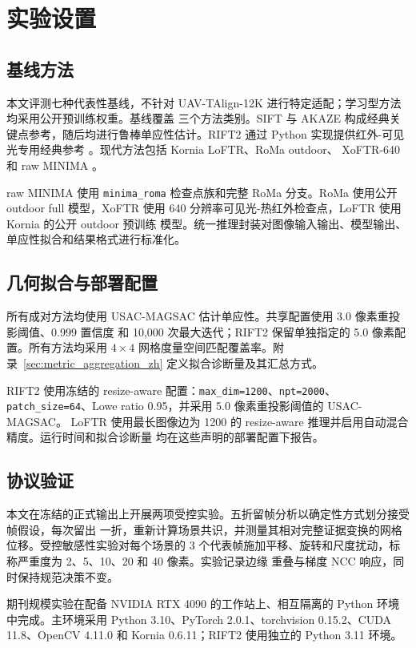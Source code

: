 
\section{实验设置}

\subsection{基线方法}

本文评测七种代表性基线，不针对 UAV-TAlign-12K 进行特定适配；学习型方法均采用公开预训练权重。基线覆盖
三个方法类别。SIFT 与 AKAZE 构成经典关键点参考，随后均进行鲁棒单应性估计。RIFT2 通过
Python 实现提供红外-可见光专用经典参考 \cite{li2023rift2,yagmur_rift2_python}。现代方法包括 Kornia LoFTR、RoMa outdoor、
XoFTR-640 和 raw MINIMA
\cite{sun2021loftr,edstedt2024roma,tuzcuoglu2024xoftr,ren2025minima}。

raw MINIMA 使用 \texttt{minima\_roma} 检查点族和完整 RoMa 分支。RoMa 使用公开 outdoor full
模型，XoFTR 使用 640 分辨率可见光-热红外检查点，LoFTR 使用 Kornia 的公开 outdoor 预训练
模型。统一推理封装对图像输入输出、模型输出、单应性拟合和结果格式进行标准化。

\subsection{几何拟合与部署配置}

所有成对方法均使用 USAC-MAGSAC 估计单应性。共享配置使用 3.0 像素重投影阈值、0.999 置信度
和 10,000 次最大迭代；RIFT2 保留单独指定的 5.0 像素配置。所有方法均采用 $4\!\times\!4$
网格度量空间匹配覆盖率。附录~\ref{sec:metric_aggregation_zh} 定义拟合诊断量及其汇总方式。

RIFT2 使用冻结的 resize-aware 配置：\texttt{max\_dim=1200}、\texttt{npt=2000}、
\texttt{patch\_size=64}、Lowe ratio 0.95，并采用 5.0 像素重投影阈值的 USAC-MAGSAC。
LoFTR 使用最长图像边为 1200 的 resize-aware 推理并启用自动混合精度。运行时间和拟合诊断量
均在这些声明的部署配置下报告。

\subsection{协议验证}

本文在冻结的正式输出上开展两项受控实验。五折留帧分析以确定性方式划分接受帧假设，每次留出
一折，重新计算场景共识，并测量其相对完整证据变换的网格位移。受控敏感性实验对每个场景的
3 个代表帧施加平移、旋转和尺度扰动，标称严重度为 2、5、10、20 和 40 像素。实验记录边缘
重叠与梯度 NCC 响应，同时保持规范决策不变。

期刊规模实验在配备 NVIDIA RTX 4090 的工作站上、相互隔离的 Python 环境中完成。主环境采用
Python 3.10、PyTorch 2.0.1、torchvision 0.15.2、CUDA 11.8、OpenCV 4.11.0 和
Kornia 0.6.11；RIFT2 使用独立的 Python 3.11 环境。
